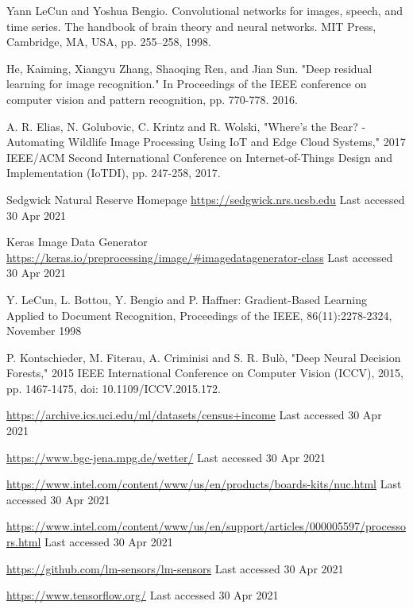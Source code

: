 \documentclass[runningheads]{llncs}
\begin{document}
\begin{thebibliography}{8}


Yann LeCun and Yoshua Bengio. Convolutional networks for images, speech, and time series. The handbook of brain theory and neural networks. MIT Press, Cambridge, MA, USA, pp. 255–258, 1998.

He, Kaiming, Xiangyu Zhang, Shaoqing Ren, and Jian Sun. "Deep residual learning for image recognition." In Proceedings of the IEEE conference on computer vision and pattern recognition, pp. 770-778. 2016.

A. R. Elias, N. Golubovic, C. Krintz and R. Wolski, "Where's the Bear? - Automating Wildlife Image Processing Using IoT and Edge Cloud Systems," 2017 IEEE/ACM Second International Conference on Internet-of-Things Design and Implementation (IoTDI), pp. 247-258, 2017.

Sedgwick Natural Reserve Homepage \url{https://sedgwick.nrs.ucsb.edu} Last accessed 30 Apr 2021


Keras Image Data Generator \url{https://keras.io/preprocessing/image/\#imagedatagenerator-class} Last accessed 30 Apr 2021


Y. LeCun, L. Bottou, Y. Bengio and P. Haffner: Gradient-Based Learning Applied to Document Recognition, Proceedings of the IEEE, 86(11):2278-2324, November 1998

P. Kontschieder, M. Fiterau, A. Criminisi and S. R. Bulò, "Deep Neural Decision Forests," 2015 IEEE International Conference on Computer Vision (ICCV), 2015, pp. 1467-1475, doi: 10.1109/ICCV.2015.172.

\url{https://archive.ics.uci.edu/ml/datasets/census+income} Last accessed 30 Apr 2021

\url{https://www.bgc-jena.mpg.de/wetter/} Last accessed 30 Apr 2021 

\url{https://www.intel.com/content/www/us/en/products/boards-kits/nuc.html} Last accessed 30 Apr 2021 


\url{https://www.intel.com/content/www/us/en/support/articles/000005597/processors.html} Last accessed 30 Apr 2021 


\url{https://github.com/lm-sensors/lm-sensors} Last accessed 30 Apr 2021 


\url{https://www.tensorflow.org/} Last accessed 30 Apr 2021 



\end{thebibliography}
\end{document}
